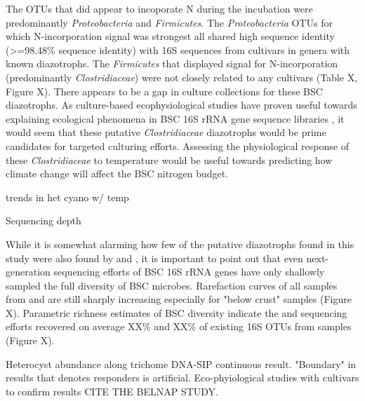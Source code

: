 The OTUs that did appear to incoporate N during the incubation were predominantly \textit{Proteobacteria} and \textit{Firmicutes}. The \textit{Proteobacteria} OTUs for which N-incorporation signal was strongest all shared high sequence identity (\textgreater=98.48\% sequence identity) with 16S sequences from cultivars in genera with known diazotrophs. The \textit{Firmicutes} that displayed signal for N-incorporation (predominantly \textit{Clostridiaceae}) were not closely related to any cultivars (Table X, Figure X). There appears to be a gap in culture collections for these BSC diazotrophs. As culture-based ecophysiological studies have proven useful towards explaining ecological phenomena in BSC 16S rRNA gene sequence libraries \cite{Garcia_Pichel_2013}, it would seem that these putative \textit{Clostridiaceae} diazotrophs would be prime candidates for targeted culturing efforts. Assessing the physiological response of these \textit{Clostridiaceae} to temperature would be useful towards predicting how climate change will affect the BSC nitrogen budget.   

\cite{Yeager_2012} trends in het cyano w/ temp

Sequencing depth

While it is somewhat alarming how few of the putative diazotrophs found in this study were also found by \citet{Garcia_Pichel_2013} and \citet{Steven_2013}, it is important to point out that even next-generation sequencing efforts of BSC 16S rRNA genes have only shallowly sampled the full diversity of BSC microbes. Rarefaction curves of all samples from \citet{Steven_2013} and \citet{Garcia_Pichel_2013} are still sharply increasing especially for "below crust" samples (Figure X). Parametric richness estimates of BSC diversity indicate the \citet{Steven_2013} and \citet{Garcia_Pichel_2013} sequencing efforts recovered on average XX\% and XX\% of existing 16S OTUs from samples (Figure X).

Heterocyst abundance along trichome
DNA-SIP continuous result. "Boundary" in results that denotes responders is artificial. Eco-phyiological studies with cultivars to confirm results CITE THE BELNAP STUDY.


